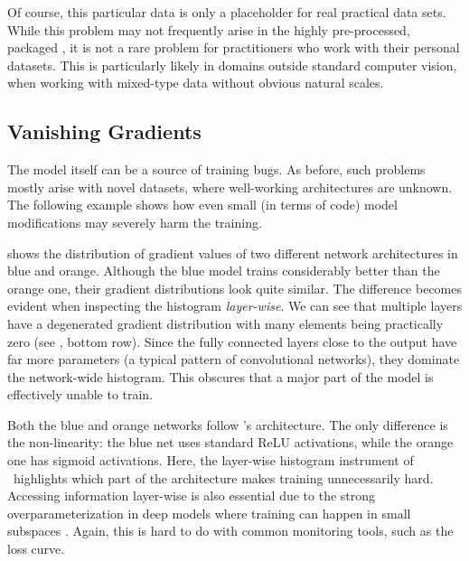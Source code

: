 

Of course, this particular data is only a placeholder for real practical data
sets. While this problem may not frequently arise in the highly pre-processed,
packaged \cifarten, it is not a rare problem for practitioners who work with
their personal datasets. This is particularly likely in domains outside
standard computer vision, \eg when working with mixed-type data without obvious
natural scales.

\subsection{Vanishing Gradients}\label{cockpit::sec:vanishing_gradient_exp}

The model itself can be a source of training bugs. As before, such problems
mostly arise with novel datasets, where well-working architectures are unknown.
The following example shows how even small (in terms of code) model
modifications may severely harm the training.

 shows the distribution of gradient values of
two different network architectures in blue and orange. Although the blue model
trains considerably better than the orange one, their gradient distributions
look quite similar. The difference becomes evident when inspecting the histogram
\emph{layer-wise}. We can see that multiple layers have a degenerated gradient
distribution with many elements being practically zero (see
, bottom row). Since the fully connected
layers close to the output have far more parameters (a typical pattern of
convolutional networks), they dominate the network-wide histogram. This obscures
that a major part of the model is effectively unable to train.



Both the blue and orange networks follow \deepobs's \threecthreed architecture.
The only difference is the non-linearity: the blue net uses standard ReLU
activations, while the orange one has sigmoid activations. Here, the layer-wise
histogram instrument of \cockpit~highlights which part of the architecture makes
training unnecessarily hard. Accessing information layer-wise is also essential
due to the strong overparameterization in deep models where training can happen
in small subspaces \citep{gurari2018gradient}. Again, this is hard to do with
common monitoring tools, such as the loss curve.

